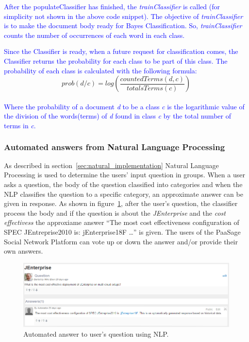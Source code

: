 \textcolor{blue}{After the populateClassifier has finished, the \emph{trainClassifier} is called (for simplicity not shown in the above code snippet). The objective of \emph{trainClassifier} is to make the document body ready for Bayes Classification. So, \emph{trainClassifier} counts the number of occurrences of each word in each class.}

\textcolor{blue}{Since the Classifier is ready, when a future request for classification comes, the Classifier returns the probability for each class to be part of this class. The probability of each class is calculated with the following formula:} 
\\
\[prob(d / c) = log\left ( \frac{countedTerms(d, c)}{totalsTerms(c)} \right )\]
\\
\textcolor{blue}{Where the probability of a document {\it d} to be a class {\it c} is the logarithmic value of the division of the words(terms) of {\it d} found in class {\it c} by the total number of terms in {\it c}.}

\subsubsection{Automated answers from Natural Language Processing}
\label{sec:example_nlp}
As described in section~\ref{sec:natural_implementation} Natural Language Processing is used to determine the users' input question in groups. When a user asks a question, the body of the question classified into categories and when the NLP classifies the question to a specific category, an approximate answer can be given in response. As shown in figure~\ref{fig:nlp_example}, after the user's question, the classifier process the body and if the question is about the {\it JEnterprise} and the {\it cost effectivess} the approxiame answer ``The most cost effectiveness configuration of SPEC JEntreprise2010 is: jEnterprise18F \ldots'' is given. The users of the PaaSage Social Network Platform can vote up or down the answer and/or provide their own answers.
\begin{figure}
  \centering
  \includegraphics[scale=0.6]{./fig/nlp_example.png}
  \caption{Automated answer to user's question using NLP.}
  \label{fig:nlp_example}
\end{figure}



